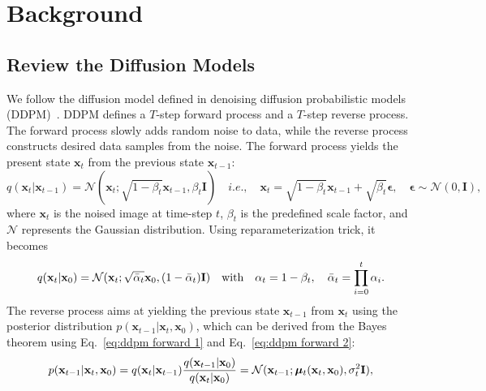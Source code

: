 \documentclass{article} \usepackage{iclr2023_conference,times}
\begin{document}
\section{Background}
\label{gen_inst}

\subsection{Review the Diffusion Models}
We follow the diffusion model defined in denoising diffusion probabilistic models (DDPM)~\citep{ho2020denoising}. DDPM defines a $T$-step forward process and a $T$-step reverse process. The forward process slowly adds random noise to data, while the reverse process constructs desired data samples from the noise. The forward process yields the present state $\mathbf{x}_{t}$ from the previous state $\mathbf{x}_{t-1}$:
\begin{equation}
    q(\mathbf{x}_{t}|\mathbf{x}_{t-1})=\mathcal{N}(\mathbf{x}_{t};\sqrt{1-\beta_{t}}\mathbf{x}_{t-1},\beta_{t}\mathbf{I})\quad i.e.,\quad \mathbf{x}_{t}=\sqrt{1-\beta_{t}}\mathbf{x}_{t-1} + \sqrt{\beta_{t}}\boldsymbol{\epsilon}, \quad\boldsymbol{\epsilon}\sim \mathcal{N}(0,\mathbf{I}), 
    \label{eq:ddpm forward 1}
\end{equation}
where $\mathbf{x}_{t}$ is the noised image at time-step $t$, $\beta_{t}$ is the predefined scale factor, and $\mathcal{N}$ represents the Gaussian distribution. Using reparameterization trick, it becomes
\begin{equation}
    q(\mathbf{x}_{t}|\mathbf{x}_{0})=\mathcal{N}(\mathbf{x}_{t};\sqrt{\Bar{\alpha}_{t}}\mathbf{x}_{0},(1-\Bar{\alpha}_{t})\mathbf{I})\quad \text{with}\quad \alpha_{t} = 1- \beta_{t}, \quad \Bar{\alpha}_{t} = \prod_{i=0}^{t}\alpha_{i}.
    \label{eq:ddpm forward 2}
\end{equation}
The reverse process aims at yielding the previous state $\mathbf{x}_{t-1}$ from $\mathbf{x}_{t}$ using the posterior distribution $p(\mathbf{x}_{t-1}|\mathbf{x}_{t},\mathbf{x}_{0})$, which can be derived from the Bayes theorem using Eq.~\ref{eq:ddpm forward 1} and Eq.~\ref{eq:ddpm forward 2}:
\begin{equation}
    p(\mathbf{x}_{t-1}|\mathbf{x}_{t},\mathbf{x}_{0})=q(\mathbf{x}_{t}|\mathbf{x}_{t-1})\frac{q(\mathbf{x}_{t-1}|\mathbf{x}_{0})}{q(\mathbf{x}_{t}|\mathbf{x}_{0})}\\
    =\mathcal{N}(\mathbf{x}_{t-1};\boldsymbol{\mu}_{t}(\mathbf{x}_{t},\mathbf{x}_{0}),\sigma_{t}^2\mathbf{I}),
    \label{eq:ddpm reverse 1}
\end{equation}
\end{document}
